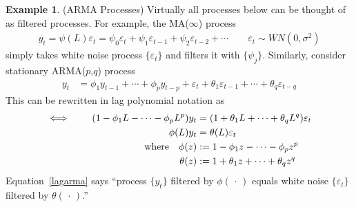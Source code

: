 \documentclass[12pt]{article}
\theoremstyle{plain}
\theoremstyle{definition}
\newtheorem{ex}[thm]{Example}
\theoremstyle{remark}
\begin{document}
\begin{ex}(ARMA Processes)
Virtually all processes below can be thought of as filtered processes.
For example, the MA($\infty$) process
\begin{align*}
  y_t = \psi(L)\varepsilon_t
  = \psi_0\varepsilon_t
  + \psi_1\varepsilon_{t-1}
  + \psi_2\varepsilon_{t-2}
  + \cdots
  \qquad
  \varepsilon_t \sim WN(0,\sigma^2)
\end{align*}
simply takes white noise process $\{\varepsilon_t\}$ and filters it
with $\{\psi_j\}$. Similarly, consider stationary ARMA($p$,$q$) process
\begin{align*}
  y_t
  &= \phi_1 y_{t-1}
  +\cdots
  + \phi_p y_{t-p}
  + \varepsilon_t
  + \theta_1\varepsilon_{t-1}
  + \cdots
  + \theta_q\varepsilon_{t-q}
\end{align*}
This can be rewritten in lag polynomial notation as
\begin{align}
  \iff\qquad
  (1 - \phi_1 L - \cdots - \phi_pL^p)y_t
  &=
  (1+ \theta_1 L + \cdots +\theta_qL^q )\varepsilon_t
  \notag
  \\
  \phi(L)y_t
  &=
  \theta(L)\varepsilon_t
  \label{lagarma}
  \\
  \text{where}\quad
  \phi(z) &:=
  1 - \phi_1 z - \cdots - \phi_pz^p
  \notag
  \\
  \theta(z)
  &:=
  1+ \theta_1 z + \cdots +\theta_qz^q
  \notag
\end{align}
Equation~\ref{lagarma} says ``process $\{y_t\}$ filtered by
$\phi(\,\cdot\,)$ equals white noise $\{\varepsilon_t\}$ filtered by
$\theta(\,\cdot\,)$.''
\end{ex}
\end{document}
